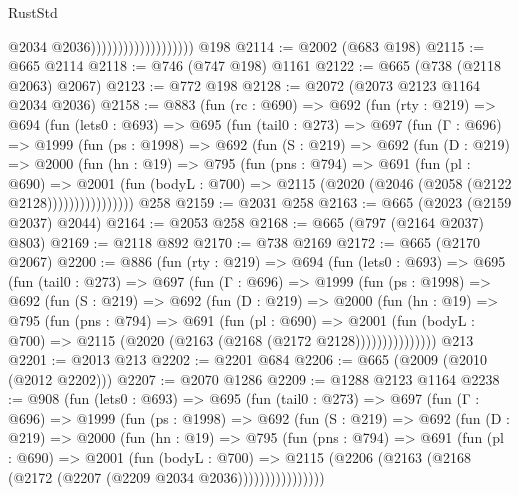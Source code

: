 \begin{lexlean}{RustStd}
\begin{coremodule}
                                          @2034
                                          @2036)))))))))))))))))))
    @198
@2114 := @2002 (@683 @198)
@2115 := @665 @2114
@2118 := @746 (@747 @198) @1161
@2122 := @665 (@738 (@2118 @2063) @2067)
@2123 := @772 @198
@2128 := @2072 (@2073 @2123 @1164 @2034 @2036)
@2158 := @883
    (fun (rc : @690) =>
    @692
      (fun (rty : @219) =>
      @694
        (fun (lets0 : @693) =>
        @695
          (fun (tail0 : @273) =>
          @697
            (fun (Γ : @696) =>
            @1999
              (fun (ps : @1998) =>
              @692
                (fun (S : @219) =>
                @692
                  (fun (D : @219) =>
                  @2000
                    (fun (hn : @19) =>
                    @795
                      (fun (pns : @794) =>
                      @691
                        (fun (pl : @690) =>
                        @2001
                          (fun (bodyL : @700) =>
                          @2115 (@2020 (@2046 (@2058 (@2122 @2128))))))))))))))))
    @258
@2159 := @2031 @258
@2163 := @665 (@2023 (@2159 @2037) @2044)
@2164 := @2053 @258
@2168 := @665 (@797 (@2164 @2037) @803)
@2169 := @2118 @892
@2170 := @738 @2169
@2172 := @665 (@2170 @2067)
@2200 := @886
    (fun (rty : @219) =>
    @694
      (fun (lets0 : @693) =>
      @695
        (fun (tail0 : @273) =>
        @697
          (fun (Γ : @696) =>
          @1999
            (fun (ps : @1998) =>
            @692
              (fun (S : @219) =>
              @692
                (fun (D : @219) =>
                @2000
                  (fun (hn : @19) =>
                  @795
                    (fun (pns : @794) =>
                    @691
                      (fun (pl : @690) =>
                      @2001
                        (fun (bodyL : @700) =>
                        @2115 (@2020 (@2163 (@2168 (@2172 @2128)))))))))))))))
    @213
@2201 := @2013 @213
@2202 := @2201 @684
@2206 := @665 (@2009 (@2010 (@2012 @2202)))
@2207 := @2070 @1286
@2209 := @1288 @2123 @1164
@2238 := @908
    (fun (lets0 : @693) =>
    @695
      (fun (tail0 : @273) =>
      @697
        (fun (Γ : @696) =>
        @1999
          (fun (ps : @1998) =>
          @692
            (fun (S : @219) =>
            @692
              (fun (D : @219) =>
              @2000
                (fun (hn : @19) =>
                @795
                  (fun (pns : @794) =>
                  @691
                    (fun (pl : @690) =>
                    @2001
                      (fun (bodyL : @700) =>
                      @2115 (@2206 (@2163 (@2168 (@2172 (@2207 (@2209 @2034 @2036))))))))))))))))

\end{coremodule}
\end{lexlean}
